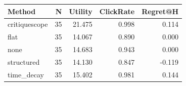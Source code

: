 \begin{tabular}{lrrrr}
\toprule
Method & N & Utility & ClickRate & Regret@H \\
\midrule
critiquescope & 35 & 21.475 & 0.998 & 0.114 \\
flat & 35 & 14.067 & 0.890 & 0.000 \\
none & 35 & 14.683 & 0.943 & 0.000 \\
structured & 35 & 14.130 & 0.847 & -0.119 \\
time_decay & 35 & 15.402 & 0.981 & 0.144 \\
\bottomrule
\end{tabular}
